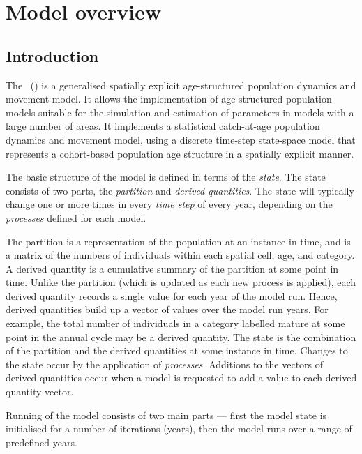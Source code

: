 \section{Model overview\label{sec:overview}}

\subsection{Introduction}

The \SPMName\ (\SPM) is a generalised spatially explicit age-structured population dynamics and movement model. It allows the implementation of age-structured population models suitable for the simulation and estimation of parameters in models with a large number of areas. It implements a statistical catch-at-age population dynamics and movement model, using a discrete time-step state-space model that represents a cohort-based population age structure in a spatially explicit manner. 

The basic structure  of the model is defined in terms of the \emph{state}. The state consists of two parts, the \emph{partition} and \emph{derived quantities}. The state will typically change one or more times in every \emph{time step} of every year, depending on the \emph{processes} defined for each model. 

 The partition is a representation of the population at an instance in time, and is a matrix of the numbers of individuals within each spatial cell, age, and category. A derived quantity is a cumulative summary of the partition at some point in time. Unlike the partition (which is updated as each new process is applied), each derived quantity records a single value for each year of the model run. Hence, derived quantities build up a vector of values over the model run years. For example, the total number of individuals in a category labelled mature at some point in the annual cycle may be a derived quantity. The state is the combination of the partition and the derived quantities at some instance in time. Changes to the state occur by the application of \emph{processes}. Additions to the vectors of derived quantities occur when a model is requested to add a value to each derived quantity vector. 

Running of the model consists of two main parts --- first the model state is initialised for a number of iterations (years), then the model runs over a range of predefined years. 

